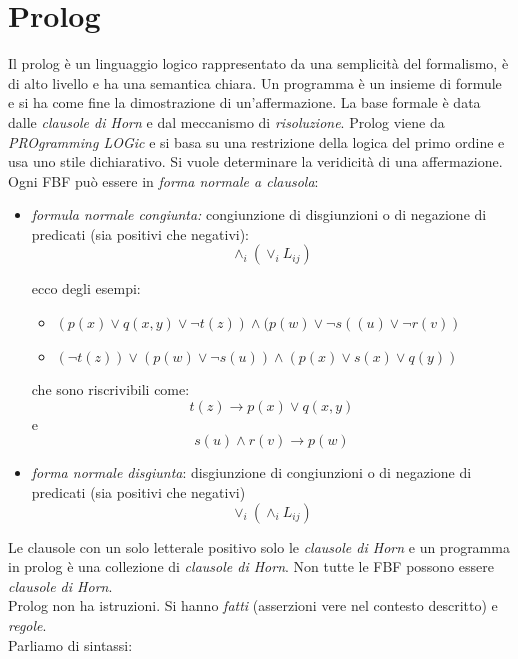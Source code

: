 \documentclass[a4paper,12pt, oneside]{book}
\begin{document}
\chapter{Prolog}
Il prolog è un linguaggio logico rappresentato da una semplicità del formalismo, è di alto livello e ha una semantica chiara. Un programma è un insieme di formule e si ha come fine la dimostrazione di un'affermazione. La base formale è data dalle \textit{clausole di Horn} e dal meccanismo di \textit{risoluzione}. Prolog viene da \textit{PROgramming LOGic} e si basa su una restrizione della logica del primo ordine e usa uno stile dichiarativo. Si vuole determinare la veridicità di una affermazione. Ogni FBF può essere in \textit{forma normale a clausola}:
\begin{itemize}
	\item \textit{formula normale congiunta:} congiunzione di disgiunzioni o di negazione di predicati (sia positivi che negativi):
	      $$\wedge_i(\vee_iL_{ij})$$
	      \begin{esempio}
		      ecco degli esempi:
		      \begin{itemize}
			      \item $(p(x)\vee q(x,y)\vee \neg t(z))\wedge(p(w)\vee\neg s((u)\vee \neg r(v))$
			      \item $(\neg t(z))\vee (p(w)\vee\neg s(u))\wedge (p(x)\vee s(x)\vee q(y))$
		      \end{itemize}
		      che sono riscrivibili come:
		      $$t(z)\to p(x)\vee q(x,y)$$
		      e
		      $$s(u)\wedge r(v)\to p(w)$$
	      \end{esempio}
	\item \textit{forma normale disgiunta}: disgiunzione di congiunzioni o di negazione di predicati (sia positivi che negativi)
	      $$\vee_i(\wedge_iL_{ij})$$
\end{itemize}
Le clausole con un solo letterale positivo solo le \textit{clausole di Horn} e un programma in prolog è una collezione di \textit{clausole di Horn}. Non tutte le FBF possono essere \textit{clausole di Horn}.\\
Prolog non ha istruzioni. Si hanno \textit{fatti} (asserzioni vere nel contesto descritto) e \textit{regole}.\\
Parliamo di sintassi:
\end{document}
